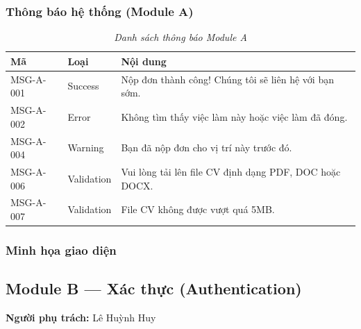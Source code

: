 \subsubsection*{Thông báo hệ thống (Module A)}
\begin{table}[H]
    \centering
    \renewcommand{\arraystretch}{1.3}
    \begin{tabular}{|l|l|p{8cm}|}
        \hline
        \textbf{Mã} & \textbf{Loại} & \textbf{Nội dung} \\ \hline
        MSG-A-001 & Success & Nộp đơn thành công! Chúng tôi sẽ liên hệ với bạn sớm. \\ \hline
        MSG-A-002 & Error & Không tìm thấy việc làm này hoặc việc làm đã đóng. \\ \hline
        MSG-A-004 & Warning & Bạn đã nộp đơn cho vị trí này trước đó. \\ \hline
        MSG-A-006 & Validation & Vui lòng tải lên file CV định dạng PDF, DOC hoặc DOCX. \\ \hline
        MSG-A-007 & Validation & File CV không được vượt quá 5MB. \\ \hline
    \end{tabular}
    \caption{\textit{Danh sách thông báo Module A}}
\end{table}

\subsubsection*{Minh họa giao diện}

\subsection{Module B --- Xác thực (Authentication)}
\textbf{Người phụ trách:} Lê Huỳnh Huy

